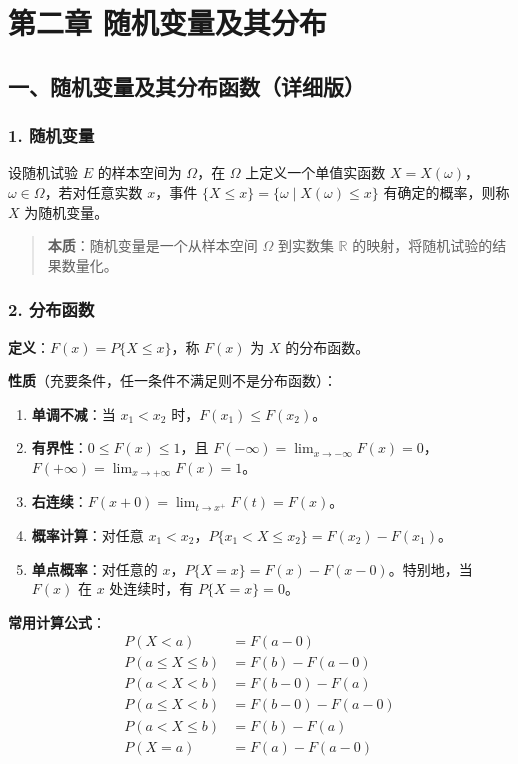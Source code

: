 \documentclass[12pt,a4paper]{ctexart}
\newenvironment{myquote}
  {\par\vspace{0.5em}\begin{quote}\sffamily\color{gray}}
  {\end{quote}\vspace{0.5em}}
\begin{document}
\section{第二章 随机变量及其分布}

\subsection{一、随机变量及其分布函数（详细版）}

\subsubsection{1. 随机变量}
设随机试验 $E$ 的样本空间为 $\Omega$，在 $\Omega$ 上定义一个单值实函数 $X = X(\omega)$，$\omega \in \Omega$，若对任意实数 $x$，事件 $\{X \le x\} = \{\omega \mid X(\omega) \le x\}$ 有确定的概率，则称 $X$ 为随机变量。

\begin{myquote}
    \textbf{本质}：随机变量是一个从样本空间 $\Omega$ 到实数集 $\mathbb{R}$ 的映射，将随机试验的结果数量化。
\end{myquote}

\subsubsection{2. 分布函数}
\textbf{定义}：$F(x) = P\{X \le x\}$，称 $F(x)$ 为 $X$ 的分布函数。

\textbf{性质}（充要条件，任一条件不满足则不是分布函数）：
\begin{enumerate}[noitemsep]
    \item \textbf{单调不减}：当 $x_1 < x_2$ 时，$F(x_1) \le F(x_2)$。
    \item \textbf{有界性}：$0 \le F(x) \le 1$，且 $F(-\infty) = \lim_{x \to -\infty} F(x) = 0$，$F(+\infty) = \lim_{x \to +\infty} F(x) = 1$。
    \item \textbf{右连续}：$F(x+0) = \lim_{t \to x^+} F(t) = F(x)$。
    \item \textbf{概率计算}：对任意 $x_1 < x_2$，$P\{x_1 < X \le x_2\} = F(x_2) - F(x_1)$。
    \item \textbf{单点概率}：对任意的 $x$，$P\{X = x\} = F(x) - F(x-0)$。特别地，当 $F(x)$ 在 $x$ 处连续时，有 $P\{X = x\} = 0$。
\end{enumerate}

\textbf{常用计算公式}：
\begin{align*}
    P(X < a)         & = F(a-0)          \\
    P(a \le X \le b) & = F(b) - F(a-0)   \\
    P(a < X < b)     & = F(b-0) - F(a)   \\
    P(a \le X < b)   & = F(b-0) - F(a-0) \\
    P(a < X \le b)   & = F(b) - F(a)     \\
    P(X = a)         & = F(a) - F(a-0)
\end{align*}
\end{document}
